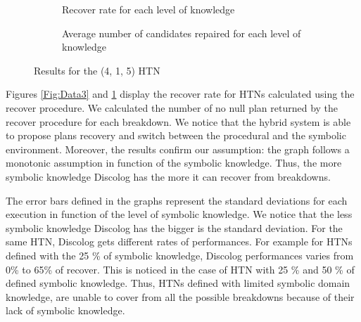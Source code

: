 \documentclass[conference]{IEEEtran}
\begin{document}
	\begin{figure}[t]
		\centering
		\begin{subfigure}[b]{0.5 \columnwidth}            
			\caption{ Recover rate for each level of knowledge}
			\label{Fig:Data1}
		\end{subfigure}
		\hspace{1cm}
		\begin{subfigure}[b]{0.5 \columnwidth}
			\centering
			\caption{Average number of candidates repaired for each level of knowledge}
			\label{Fig:Data2}
		\end{subfigure}
		\caption{Results for the (4, 1, 5) HTN}\label{fig:TOF2}
	\end{figure}	
	\par  Figures \ref{Fig:Data3} and  \ref{Fig:Data1} display the recover rate for HTNs calculated using the recover procedure.  We calculated the number of no null plan returned by the recover procedure for each breakdown. We notice that the hybrid system is able to propose plans recovery and switch between the procedural and the symbolic environment. Moreover, the results confirm our assumption: the graph follows a monotonic assumption in function of the symbolic knowledge. Thus, the more symbolic knowledge Discolog has the more it can recover from breakdowns. 
	
	The error bars defined in the graphs represent the standard deviations for each execution in function of the level of symbolic knowledge.  We notice that the less symbolic knowledge Discolog has the bigger is the standard deviation.  For the same HTN, Discolog gets different rates of performances. For example for HTNs defined with the 25 \% of symbolic knowledge, Discolog performances varies from  0\% to 65\%  of recover. This is noticed in the case of HTN with 25 \% and 50 \% of defined symbolic knowledge. Thus, HTNs  defined with limited symbolic domain knowledge, are unable to cover from all the possible breakdowns because of their lack of symbolic knowledge. 
	
\end{document}
